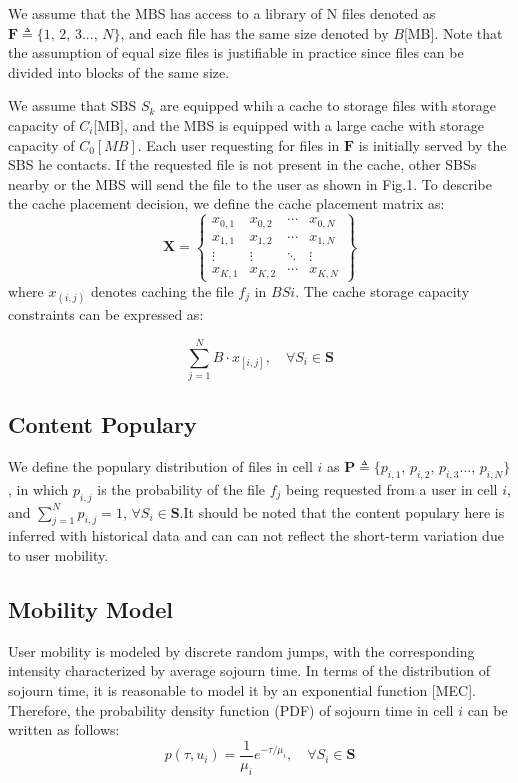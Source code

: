 \documentclass[conference]{IEEEtran}
\begin{document}
We assume that the MBS has access to a library of $\mathrm{N}$ files denoted as $\mathbf{F} \triangleq\{1\mathrm{,\,}2\mathrm{,\,}3...\mathrm{,\,}N\}$, and each file has the same size denoted by $B$[MB]. Note that the assumption of equal size files is justifiable in practice since files can be divided into blocks of the same size.

We assume that SBS $S_k$ are equipped whih a cache to storage files with storage capacity of $C_i$[MB], and the MBS is equipped with a large cache with storage capacity of
$C_0 [MB]$. Each user requesting for files in $\mathbf{F}$ is initially served by the SBS he contacts. If the requested file is not present in the cache, other SBSs nearby or the MBS will send the file to the user as shown in Fig.1. To describe the cache placement decision, we define the cache placement matrix as:
$$\mathbf{X}=
\begin{Bmatrix}
x_{0,1}    &x_{0,2}  & \cdots & x_{0,N} \\
x_{1,1}    &x_{1,2}  & \cdots & x_{1,N} \\
\vdots    &\vdots  & \ddots &\vdots \\
x_{K,1}    &x_{K,2}  & \cdots & x_{K,N}
\end{Bmatrix}
$$
where $x_(i,j)$ denotes caching the file $f_j$ in $BS i$. The cache storage capacity constraints can be expressed as:

\begin{equation}
\sum_{j=1}^N B\cdot x_{[i,j]}, \quad \forall{S_i}\in\mathbf{S}
\end{equation}
\subsection{Content Populary}
We define the populary distribution of files in cell $i$ as $\mathbf{P} \triangleq\{p_{i,1}\mathrm{,\,}p_{i,2}\mathrm{,\,}p_{i,3}...\mathrm{,\,}p_{i,N}\}$, in which $p_{i,j}$ is the probability of the file $f_j$ being requested from a user in cell $i$, and $ \sum_{j=1}^N p_{i,j}=1,\,\forall{S_i}\in\mathbf{S}$.It should be noted that the content populary here is inferred with historical data and can can not reflect the short-term variation due to user mobility.
\subsection{Mobility Model}
User mobility is modeled by discrete random jumps, with the corresponding intensity characterized by average sojourn time. In terms of the distribution of sojourn time, it is reasonable to model it by an exponential function [MEC]. Therefore, the probability density function (PDF) of sojourn time in cell $i$ can be written as follows:
\begin{equation}
p(\tau,u_i)=\frac{1}{\mu_i}e^{-\tau/\mu_i},\quad \forall{S_i}\in\mathbf{S}
\end{equation}
\end{document}
